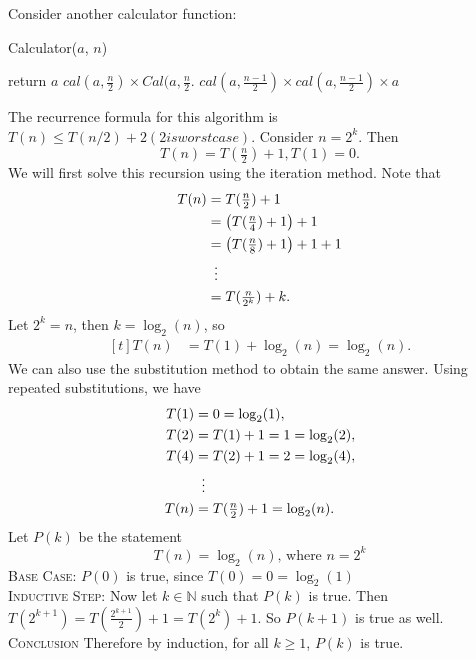 \documentclass{article}
\begin{document}
    \vspace{1.5mm}
    Consider another calculator function:
    \begin{algorithm}
    \caption{Calculator($a$, $n$)}\label{alg:Calc2}
    \begin{algorithmic}
            \State return $a$
            \State $cal(a, \tfrac{n}{2}) \times Cal(a, \tfrac{n}{2}$.
            \State $cal(a, \tfrac{n - 1}{2}) \times cal(a, \tfrac{n - 1}{2}) \times a$
        \EndIf
    \end{algorithmic}
    \end{algorithm}
    
    The recurrence formula for this algorithm is $T(n) \le T(n/2) + 2 (2 is worst case)$. Consider $n = 2^{k}$. Then $$T(n) = T(\tfrac{n}{2}) + 1, T(1) = 0.$$
    We will first solve this recursion using the iteration method. Note that
    $$\begin{aligned}[t]
        T(n) &= T(\tfrac{n}{2}) + 1 \\
        &= \left(T(\tfrac{n}{4}) + 1\right) + 1 \\
        &= \left(T(\tfrac{n}{8}) + 1\right) + 1 + 1 \\
        &\vdotswithin{ = } \\
        &= T(\tfrac{n}{2^{k}}) + k.
    \end{aligned}$$
    Let $2^{k} = n$, then $k = \log_{2}(n)$, so 
    $$\begin{aligned}[t]
        T(n) &= T(1) + \log_{2}(n) = \log_{2}(n).
    \end{aligned}$$
    We can also use the substitution method to obtain the same answer. Using repeated substitutions, we have
    \begin{align*}
        T(1) &= 0 = \log_{2}(1), \\
        T(2) &= T(1) + 1 = 1 = \log_{2}(2), \\
        T(4) &= T(2) + 1 = 2 = \log_{2}(4), \\
        &\vdotswithin{ = } \\
        T(n) &= T(\tfrac{n}{2}) + 1 = \log_{2}(n).
    \end{align*}
    Let $P(k)$ be the statement $$T(n) = \log_{2}(n) \text{, where $n = 2^{k}$}$$
    \textsc{Base Case}: $P(0)$ is true, since $T(0) = 0 = \log_{2}(1)$ \\
    \textsc{Inductive Step}: Now let $k \in \mathbb{N}$ such that $P(k)$ is true. Then $T(2^{k + 1}) = T(\tfrac{2^{k + 1}}{2}) + 1 = T(2^{k}) + 1$. So $P(k + 1)$ is true as well. \\
    \textsc{Conclusion} Therefore by induction, for all $k \ge 1$, $P(k)$ is true.
\end{document}
